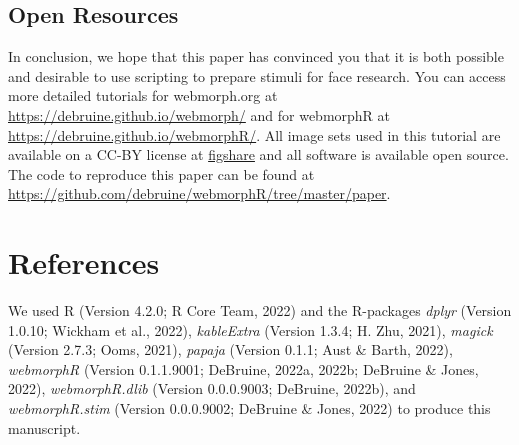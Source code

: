\documentclass[
  doc,floatsintext]{apa6}
\begin{document}
\hypertarget{open-resources}{%
\subsection{Open Resources}\label{open-resources}}

In conclusion, we hope that this paper has convinced you that it is both possible and desirable to use scripting to prepare stimuli for face research. You can access more detailed tutorials for webmorph.org at \url{https://debruine.github.io/webmorph/} and for webmorphR at \url{https://debruine.github.io/webmorphR/}. All image sets used in this tutorial are available on a CC-BY license at \href{https://figshare.com/search?q=webmorph\%20psychomorph}{figshare} and all software is available open source. The code to reproduce this paper can be found at \url{https://github.com/debruine/webmorphR/tree/master/paper}.

\newpage

\hypertarget{references}{%
\section{References}\label{references}}

We used R (Version 4.2.0; R Core Team, 2022) and the R-packages \emph{dplyr} (Version 1.0.10; Wickham et al., 2022), \emph{kableExtra} (Version 1.3.4; H. Zhu, 2021), \emph{magick} (Version 2.7.3; Ooms, 2021), \emph{papaja} (Version 0.1.1; Aust \& Barth, 2022), \emph{webmorphR} (Version 0.1.1.9001; DeBruine, 2022a, 2022b; DeBruine \& Jones, 2022), \emph{webmorphR.dlib} (Version 0.0.0.9003; DeBruine, 2022b), and \emph{webmorphR.stim} (Version 0.0.0.9002; DeBruine \& Jones, 2022) to produce this manuscript.

\begingroup
\setlength{\parindent}{-0.5in}
\setlength{\leftskip}{0.5in}
\end{document}
